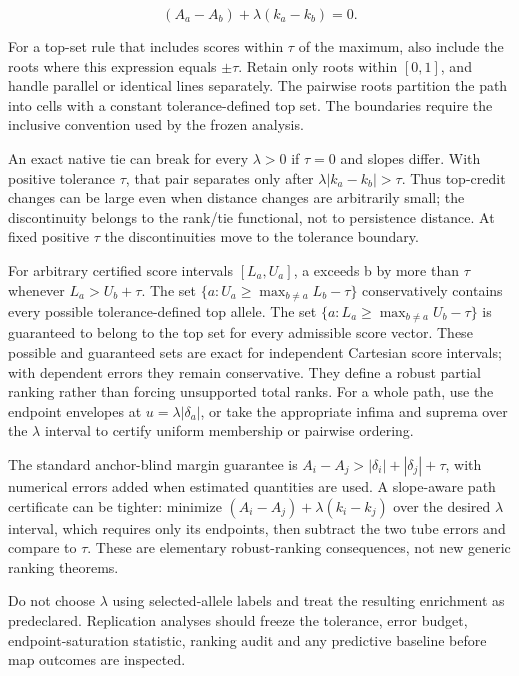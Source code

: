 \documentclass[
  11pt,
]{article}
\begin{document}
\[
(A_a-A_b)+\lambda(k_a-k_b)=0.
\]

For a top-set rule that includes scores within \(\tau\) of the maximum,
also include the roots where this expression equals \(\pm \tau\). Retain
only roots within \([0,1]\), and handle parallel or identical lines
separately. The pairwise roots partition the path into cells with a
constant tolerance-defined top set. The boundaries require the inclusive
convention used by the frozen analysis.

An exact native tie can break for every \(\lambda>0\) if \(\tau=0\) and
slopes differ. With positive tolerance \(\tau\), that pair separates
only after \(\lambda|k_a-k_b|>\tau\). Thus top-credit changes can be
large even when distance changes are arbitrarily small; the
discontinuity belongs to the rank/tie functional, not to persistence
distance. At fixed positive \(\tau\) the discontinuities move to the
tolerance boundary.

For arbitrary certified score intervals \([L_a,U_a]\), a exceeds b by
more than \(\tau\) whenever \(L_a>U_b+\tau\). The set
\(\{a: U_a\geq \max_{b\ne a}L_b-\tau\}\) conservatively contains every
possible tolerance-defined top allele. The set
\(\{a: L_a\geq \max_{b\ne a}U_b-\tau\}\) is guaranteed to belong to the
top set for every admissible score vector. These possible and guaranteed
sets are exact for independent Cartesian score intervals; with dependent
errors they remain conservative. They define a robust partial ranking
rather than forcing unsupported total ranks. For a whole path, use the
endpoint envelopes at \(u=\lambda|\delta_a|\), or take the appropriate
infima and suprema over the \(\lambda\) interval to certify uniform
membership or pairwise ordering.

The standard anchor-blind margin guarantee is
\(A_i-A_j>|\delta_i|+|\delta_j|+\tau\), with numerical errors added when
estimated quantities are used. A slope-aware path certificate can be
tighter: minimize \((A_i-A_j)+\lambda(k_i-k_j)\) over the desired
\(\lambda\) interval, which requires only its endpoints, then subtract
the two tube errors and compare to \(\tau\). These are elementary
robust-ranking consequences, not new generic ranking theorems.

Do not choose \(\lambda\) using selected-allele labels and treat the
resulting enrichment as predeclared. Replication analyses should freeze
the tolerance, error budget, endpoint-saturation statistic, ranking
audit and any predictive baseline before map outcomes are inspected.
\end{document}
